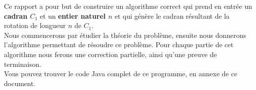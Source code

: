 Ce rapport a pour but de construire un algorithme correct qui prend en entrée un \textbf{cadran $C_{1}$} et un \textbf{entier naturel $n$} et qui génère le cadran résultant de la rotation de longueur $n$ de $C_{1}$.\\

Nous commencerons par étudier la théorie du problème, ensuite nous donnerons l'algorithme permettant de résoudre ce problème. Pour chaque partie de cet algorithme nous  ferons une correction partielle, ainsi qu'une preuve de terminaison. \\

Vous pouvez trouver le code Java complet de ce programme, en annexe de ce document.